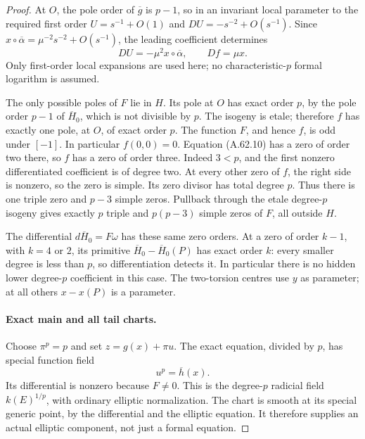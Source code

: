 \begin{proof}
At \(O\), the pole order of \(\overline g\) is
\(p-1\), so in an invariant local parameter to
the required first order \(U=s^{-1}+O(1)\) and
\(DU=-s^{-2}+O(s^{-1})\). Since
\(x\circ\overline\alpha=\mu^{-2}s^{-2}+O(s^{-1})\),
the leading coefficient determines
\[
       DU=-\mu^2x\circ\overline\alpha,
          \qquad Df=\mu x.                           \tag{A.62.10}
\]
Only first-order local expansions are used here;
no characteristic-\(p\) formal logarithm is assumed.

The only possible poles of \(F\) lie in \(H\).
Its pole at \(O\) has exact order \(p\), by the
pole order \(p-1\) of \(\overline H_0\), which is
not divisible by \(p\). The isogeny is etale;
therefore \(f\) has exactly one pole, at \(O\),
of exact order \(p\). The function \(F\), and
hence \(f\), is odd under \([-1]\).
In particular \(f(0,0)=0\). Equation (A.62.10)
has a zero of order two there, so \(f\) has a
zero of order three. Indeed \(3<p\), and the
first nonzero differentiated coefficient is of
degree two. At every other zero of \(f\), the
right side is nonzero, so the zero is simple.
Its zero divisor has total degree \(p\). Thus
there is one triple zero and \(p-3\) simple zeros.
Pullback through the etale degree-\(p\) isogeny gives
exactly \(p\) triple and \(p(p-3)\) simple zeros
of \(F\), all outside \(H\).

The differential \(d\overline H_0=F\omega\)
has these same zero orders. At a zero of order
\(k-1\), with \(k=4\) or \(2\), its primitive
\(\overline H_0-\overline H_0(P)\) has exact
order \(k\): every smaller degree is less than
\(p\), so differentiation detects it. In particular
there is no hidden lower degree-\(p\) coefficient
in this case. The two-torsion centres use \(y\)
as parameter; at all others \(x-x(P)\) is a parameter.

\paragraph{Exact main and all tail charts.}
Choose \(\pi^p=p\) and set \(z=g(x)+\pi u\).
The exact equation, divided by \(p\), has special
function field
\[
                         u^p=\overline h(x).
                                                        \tag{A.62.11}
\]
Its differential is nonzero because \(F\ne0\).
This is the degree-\(p\) radicial field
\(k(E)^{1/p}\), with ordinary elliptic normalization.
The chart is smooth at its special generic point,
by the differential and the elliptic equation.
It therefore supplies an actual elliptic component,
not just a formal equation.


\end{proof}

